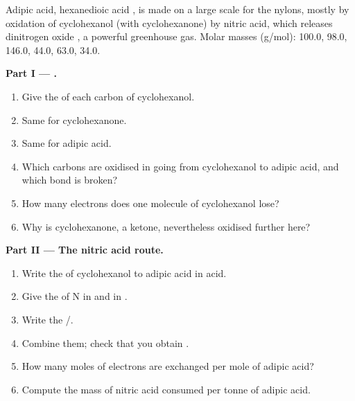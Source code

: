 \begin{problem}
\label{pb:b1:organic-redox:1}
Adipic acid, hexanedioic acid , is made on a large scale
for the nylons, mostly by oxidation of cyclohexanol (with cyclohexanone)
by nitric acid, which releases dinitrogen oxide , a powerful
greenhouse gas. Molar masses (\unit{g/mol}):  100.0,
 98.0,  146.0,  44.0,  63.0,
 34.0.

\medskip
\noindent\textbf{Part I --- .}
\begin{enumerate}
  \item Give the  of each carbon of cyclohexanol.
  \item Same for cyclohexanone.
  \item Same for adipic acid.
  \item Which carbons are oxidised in going from cyclohexanol to adipic
        acid, and which bond is broken?
  \item How many electrons does one molecule of cyclohexanol lose?
  \item Why is cyclohexanone, a ketone, nevertheless oxidised further here?
\end{enumerate}

\medskip
\noindent\textbf{Part II --- The nitric acid route.}
\begin{enumerate}[resume]
  \item Write the  of cyclohexanol to adipic acid in acid.
  \item Give the  of N in  and in .
  \item Write the  /.
  \item Combine them; check that you obtain
        .
  \item How many moles of electrons are exchanged per mole of adipic
        acid?
  \item Compute the mass of nitric acid consumed per tonne of adipic acid.
\end{enumerate}


\end{problem}
